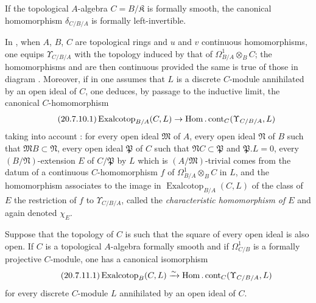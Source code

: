 \begin{corollary}[20.7.9]
\label{0.20.7.9}
If the topological $A$-algebra $C=B/\mathfrak{K}$ is formally smooth, the canonical homomorphism $\delta_{C/B/A}$ is formally left-invertible.
\end{corollary}

\begin{env}[20.7.10]
\label{0.20.7.10}
In , when $A$, $B$, $C$ are topological rings and $u$ and $v$ continuous homomorphisms, one equips $\Upsilon_{C/B/A}$ with the topology induced by that of $\Omega^1_{B/A}\otimes_B C$; the homomorphisms  and  are then continuous provided the same is true of those in diagram . Moreover, if in  one assumes that $L$ is a discrete $C$-module annihilated by an open ideal of $C$, one deduces, by passage to the inductive limit, the canonical $C$-homomorphism
\begin{equation}
\tag{20.7.10.1}
  \label{0.20.7.10.1}
  \operatorname{Exalcotop}_{B/A}(C,L)\to\operatorname{Hom}.\operatorname{cont}_C(\Upsilon_{C/B/A},L)
\end{equation}
taking into account : for every open ideal $\mathfrak{M}$ of $A$, every open ideal $\mathfrak{N}$ of $B$ such that $\mathfrak{M}B\subset\mathfrak{N}$, every open ideal $\mathfrak{P}$ of $C$ such that $\mathfrak{N}C\subset\mathfrak{P}$ and $\mathfrak{P}.L=0$, every $(B/\mathfrak{N})$-extension $E$ of $C/\mathfrak{P}$ by $L$ which is $(A/\mathfrak{M})$-trivial comes from the datum of a continuous $C$-homomorphism $f$ of $\Omega^1_{B/A}\otimes_B C$ in $L$, and the homomorphism  associates to the image in $\operatorname{Exalcotop}_{B/A}(C,L)$ of the class of $E$ the restriction of $f$ to $\Upsilon_{C/B/A}$, called the \emph{characteristic homomorphism of $E$} and again denoted $\chi_E$.
\end{env}

\begin{proposition}[20.7.11]
\label{0.20.7.11}
Suppose that the topology of $C$ is such that the square of every open ideal is also open.
If $C$ is a topological $A$-algebra formally smooth and if $\Omega^1_{C/B}$ is a formally projective $C$-module, one has a canonical isomorphism
\begin{equation}
\tag{20.7.11.1}
  \label{0.20.7.11.1}
  \operatorname{Exalcotop}_B(C,L)\xrightarrow{\sim}\operatorname{Hom}.\operatorname{cont}_C(\Upsilon_{C/B/A},L)
\end{equation}
for every discrete $C$-module $L$ annihilated by an open ideal of $C$.
\end{proposition}

